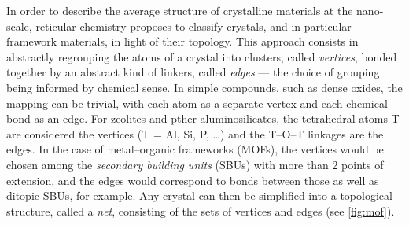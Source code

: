 \documentclass[main.tex]{subfiles}
\begin{document}
\label{topology_introduction}

In order to describe the average structure of crystalline materials at the nano-scale, reticular chemistry \autocite{reticularChemistry, reticularSynthesis} proposes to classify crystals, and in particular framework materials, in light of their topology. This approach consists in abstractly regrouping the atoms of a crystal into clusters, called \emph{vertices}, bonded together by an abstract kind of linkers, called \emph{edges} --- the choice of grouping being informed by chemical sense. In simple compounds, such as dense oxides, the mapping can be trivial, with each atom as a separate vertex and each chemical bond as an edge. For zeolites and pther aluminosilicates, the tetrahedral atoms T are considered the vertices (T = Al, Si, P, \ldots) and the T--O--T linkages are the edges. In the case of metal--organic frameworks (MOFs), the vertices would be chosen among the \emph{secondary building units} (SBUs) \autocite{SBUs} with more than 2 points of extension, and the edges would correspond to bonds between those as well as ditopic SBUs, for example. Any crystal can then be simplified into a topological structure, called a \emph{net}, consisting of the sets of vertices and edges (see \cref{fig:mof}).
\end{document}
